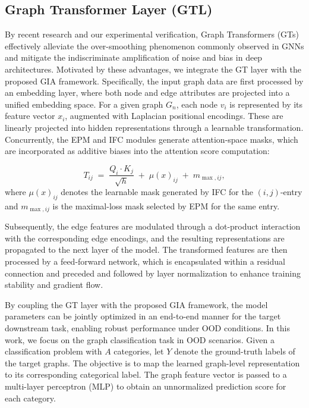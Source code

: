 \documentclass[a4paper,fleqn]{cas-dc}
\begin{document}
\subsection{Graph Transformer Layer (GTL)}


By recent research and our experimental verification, Graph Transformers (GTs) effectively alleviate the over-smoothing phenomenon commonly observed in GNNs and mitigate the indiscriminate amplification of noise and bias in deep architectures. Motivated by these advantages, we integrate the GT layer with the proposed GIA framework. Specifically, the input graph data are first processed by an embedding layer, where both node and edge attributes are projected into a unified embedding space. For a given graph \(G_n\), each node \(v_i\) is represented by its feature vector \(x_i\), augmented with Laplacian positional encodings. These are linearly projected into hidden representations through a learnable transformation. Concurrently, the EPM and IFC modules generate attention-space masks, which are incorporated as additive biases into the attention score computation:

\[
T_{ij} \;=\; \frac{Q_i \cdot K_j}{\sqrt{h}} \;+\; \mu(x)_{ij} \;+\; m_{\max,ij}, \tag{7}
\]
where \(\mu(x)_{ij}\) denotes the learnable mask generated by IFC for the \((i,j)\)-entry and \(m_{\max,ij}\) is the maximal-loss mask selected by EPM for the same entry.

Subsequently, the edge features are modulated through a dot-product interaction with the corresponding edge encodings, and the resulting representations are propagated to the next layer of the model. The transformed features are then processed by a feed-forward network, which is encapsulated within a residual connection and preceded and followed by layer normalization to enhance training stability and gradient flow.

By coupling the GT layer with the proposed GIA framework, the model parameters can be jointly optimized in an end-to-end manner for the target downstream task, enabling robust performance under OOD conditions. In this work, we focus on the graph classification task in OOD scenarios. Given a classification problem with \(A\) categories, let \(Y\) denote the ground-truth labels of the target graphs. The objective is to map the learned graph-level representation to its corresponding categorical label. The graph feature vector is passed to a multi-layer perceptron (MLP) to obtain an unnormalized prediction score for each category.
\end{document}
